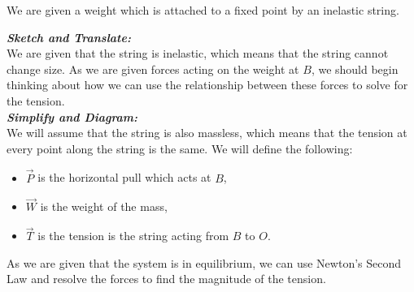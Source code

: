 %
%
%


\begin{subquestions}
	
\subquestion
We are given a weight which is attached to a fixed point by an inelastic string.

\begin{subsubquestions}
	
\subsubquestion

\textbf{\textit{Sketch and Translate:}} \\
We are given that the string is inelastic, which means that the string cannot change size. As we are given forces acting on the weight at $B$, we should begin thinking about how we can use the relationship between these forces to solve for the tension. \\




\textbf{\textit{Simplify and Diagram:}} \\
We will assume that the string is also massless, which means that the tension at every point along the string is the same. We will define the following:
\begin{itemize}
	\item $\vec{P}$ is the horizontal pull which acts at $B$,
	\item $\vec{W}$ is the weight of the mass,
	\item $\vec{T}$ is the tension is the string acting from $B$ to $O$.
\end{itemize}
As we are given that the system is in equilibrium, we can use Newton's Second Law and resolve the forces to find the magnitude of the tension. \\





\end{subsubquestions}
\end{subquestions}
